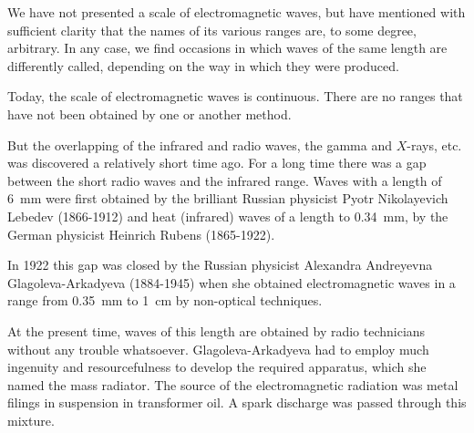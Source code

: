We have not presented a scale of electromagnetic waves, but have mentioned with sufficient clarity that the names of its various ranges are, to some degree, arbitrary. In any case, we find occasions in which waves of the same length are differently called, depending on the way in which they were produced.

Today, the scale of electromagnetic waves is continuous. There are no ranges that have not been obtained by one or another method.

But the overlapping of the infrared and radio waves, the gamma and $X$-rays, etc. was discovered a relatively short time ago. For a long time there was a gap between the short radio waves and the infrared range. Waves with a length of \SI{6}{\milli\meter} were first obtained by the brilliant Russian physicist Pyotr Nikolayevich Lebedev (1866-1912) and heat (infrared) waves of a length to \SI{0.34}{\milli\meter}, by the German physicist Heinrich Rubens (1865-1922).

In 1922 this gap was closed by the Russian physicist Alexandra Andreyevna Glagoleva-Arkadyeva (1884-1945) when she obtained electromagnetic waves in a range from \SI{0.35}{\milli\meter} to \SI{1}{\centi\meter} by non-optical techniques.

At the present time, waves of this length are obtained by radio technicians without any trouble whatsoever. Glagoleva-Arkadyeva had to employ much ingenuity and resourcefulness to develop the required apparatus, which she named the mass radiator. The source of the electromagnetic radiation was metal filings in suspension in transformer oil. A spark discharge was passed through this mixture.

